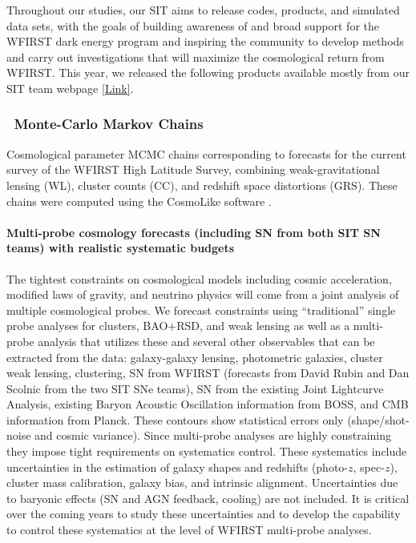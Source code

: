 Throughout our studies, our SIT aims to release codes, products, and simulated data sets, with the goals of building awareness of and broad support for the WFIRST dark energy program and inspiring the community to develop methods and carry out investigations that will maximize the cosmological return from WFIRST. This year, we released the following products available mostly from our SIT team webpage \href{http://www.wfirst-hls-cosmology.org/products/}{[Link]}.

\subsubsection{\CoLi\ Monte-Carlo Markov Chains}

Cosmological parameter MCMC chains corresponding to forecasts for the current survey of the WFIRST High Latitude Survey, combining weak-gravitational lensing (WL), cluster counts (CC), and redshift space distortions (GRS). These chains were computed using the CosmoLike software \citep{Krause2016}.

\paragraph{Multi-probe cosmology forecasts (including SN from both SIT SN teams) with realistic systematic budgets} The tightest constraints on cosmological models including cosmic acceleration, modified laws of gravity, and neutrino physics will come from a joint analysis of multiple cosmological probes. We forecast constraints using “traditional” single probe analyses for clusters, BAO+RSD, and weak lensing as well as a multi-probe analysis that utilizes these and several other observables that can be extracted from the data: galaxy-galaxy lensing, photometric galaxies, cluster weak lensing, clustering, SN from WFIRST (forecasts from David Rubin and Dan Scolnic from the two SIT SNe teams), SN from the existing Joint Lightcurve Analysis, existing Baryon Acoustic Oscillation information from BOSS, and CMB information from Planck. These contours show statistical errors only (shape/shot-noise and cosmic variance). Since multi-probe analyses are highly constraining they impose tight requirements on systematics control. These systematics include uncertainties in the estimation of galaxy shapes and redshifts (photo-$z$, spec-$z$), cluster mass calibration, galaxy bias, and intrinsic alignment. Uncertainties due to baryonic effects (SN and AGN feedback, cooling) are not included. It is critical over the coming years to study these uncertainties and to develop the capability to control these systematics at the level of WFIRST multi-probe analyses.

